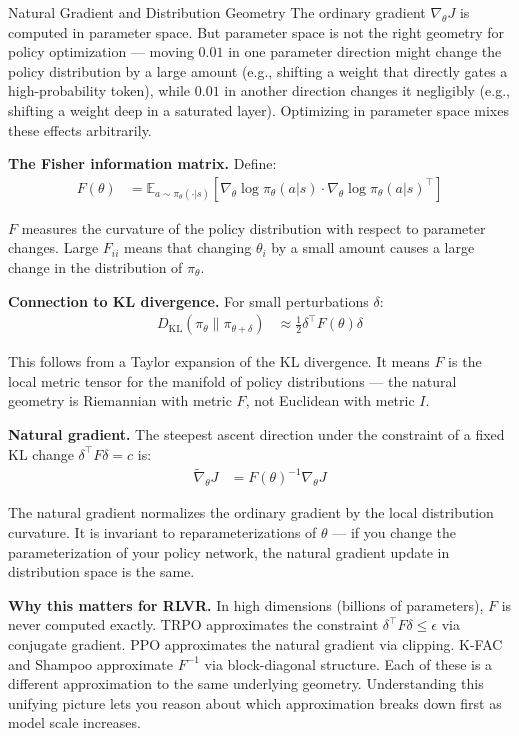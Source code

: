 \begin{thinkfirst}{Natural Gradient and Distribution Geometry}
The ordinary gradient $\nabla_\theta J$ is computed in parameter space. But parameter space is not the right geometry for policy optimization --- moving $0.01$ in one parameter direction might change the policy distribution by a large amount (e.g., shifting a weight that directly gates a high-probability token), while $0.01$ in another direction changes it negligibly (e.g., shifting a weight deep in a saturated layer). Optimizing in parameter space mixes these effects arbitrarily.

\textbf{The Fisher information matrix.} Define:
\begin{align*}
  F(\theta) &= \mathbb{E}_{a \sim \pi_\theta(\cdot|s)}\!\left[\nabla_\theta \log \pi_\theta(a|s) \cdot \nabla_\theta \log \pi_\theta(a|s)^\top\right]
\end{align*}

$F$ measures the curvature of the policy distribution with respect to parameter changes. Large $F_{ii}$ means that changing $\theta_i$ by a small amount causes a large change in the distribution of $\pi_\theta$.

\textbf{Connection to KL divergence.} For small perturbations $\delta$:
\begin{align*}
  D_{\mathrm{KL}}(\pi_\theta \| \pi_{\theta + \delta}) &\approx \frac{1}{2} \delta^\top F(\theta) \delta
\end{align*}

This follows from a Taylor expansion of the KL divergence. It means $F$ is the local metric tensor for the manifold of policy distributions --- the natural geometry is Riemannian with metric $F$, not Euclidean with metric $I$.

\textbf{Natural gradient.} The steepest ascent direction under the constraint of a fixed KL change $\delta^\top F \delta = c$ is:
\begin{align*}
  \tilde{\nabla}_\theta J &= F(\theta)^{-1} \nabla_\theta J
\end{align*}

The natural gradient normalizes the ordinary gradient by the local distribution curvature. It is invariant to reparameterizations of $\theta$ --- if you change the parameterization of your policy network, the natural gradient update in distribution space is the same.

\textbf{Why this matters for RLVR.} In high dimensions (billions of parameters), $F$ is never computed exactly. TRPO approximates the constraint $\delta^\top F \delta \leq \epsilon$ via conjugate gradient. PPO approximates the natural gradient via clipping. K-FAC and Shampoo approximate $F^{-1}$ via block-diagonal structure. Each of these is a different approximation to the same underlying geometry. Understanding this unifying picture lets you reason about which approximation breaks down first as model scale increases.
\end{thinkfirst}

